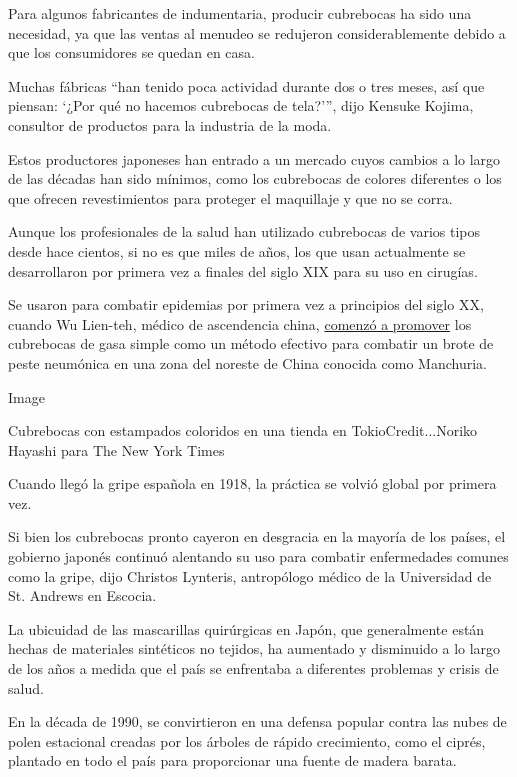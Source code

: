 Para algunos fabricantes de indumentaria, producir cubrebocas ha sido
una necesidad, ya que las ventas al menudeo se redujeron
considerablemente debido a que los consumidores se quedan en casa.

Muchas fábricas ``han tenido poca actividad durante dos o tres meses,
así que piensan: `¿Por qué no hacemos cubrebocas de tela?''', dijo
Kensuke Kojima, consultor de productos para la industria de la moda.

Estos productores japoneses han entrado a un mercado cuyos cambios a lo
largo de las décadas han sido mínimos, como los cubrebocas de colores
diferentes o los que ofrecen revestimientos para proteger el maquillaje
y que no se corra.

Aunque los profesionales de la salud han utilizado cubrebocas de varios
tipos desde hace cientos, si no es que miles de años, los que usan
actualmente se desarrollaron por primera vez a finales del siglo XIX
para su uso en cirugías.

Se usaron para combatir epidemias por primera vez a principios del siglo
XX, cuando Wu Lien-teh, médico de ascendencia china,
\href{https://www.ncbi.nlm.nih.gov/pmc/articles/PMC4291938/}{comenzó a
promover} los cubrebocas de gasa simple como un método efectivo para
combatir un brote de peste neumónica en una zona del noreste de China
conocida como Manchuria.

Image

Cubrebocas con estampados coloridos en una tienda en
TokioCredit...Noriko Hayashi para The New York Times

Cuando llegó la gripe española en 1918, la práctica se volvió global por
primera vez.

Si bien los cubrebocas pronto cayeron en desgracia en la mayoría de los
países, el gobierno japonés continuó alentando su uso para combatir
enfermedades comunes como la gripe, dijo Christos Lynteris, antropólogo
médico de la Universidad de St. Andrews en Escocia.

La ubicuidad de las mascarillas quirúrgicas en Japón, que generalmente
están hechas de materiales sintéticos no tejidos, ha aumentado y
disminuido a lo largo de los años a medida que el país se enfrentaba a
diferentes problemas y crisis de salud.

En la década de 1990, se convirtieron en una defensa popular contra las
nubes de polen estacional creadas por los árboles de rápido crecimiento,
como el ciprés, plantado en todo el país para proporcionar una fuente de
madera barata.

